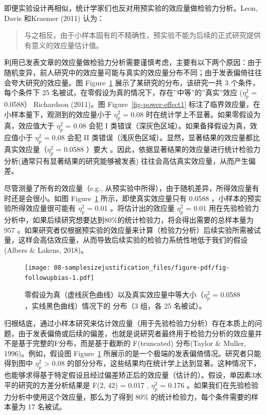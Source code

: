 \documentclass[
  letterpaper,
  DIV=11,
  numbers=noendperiod]{scrreprt}
\begin{document}
即便实验设计再相似，统计学家们也反对用预实验的效应量做检验力分析。Leon,
Davis 和Kraemer (2011) 认为：

\begin{quote}
与之相反，由于小样本固有的不精确性，预实验不能为后续的正式研究提供有意义的效应量估计值。
\end{quote}

利用已发表文章的效应量做检验力分析需要谨慎考虑，主要有以下两个原因：由于随机变异，前人研究中的效应量可能与真实的效应量分布不同；由于发表偏倚往往会夸大研究的效应量。图
Figure~\ref{fig-followupbias} 展示了某研究的分布，该研究一共 3
个条件，每个条件下 25
名被试，在零假设为真的情况下，存在''中等''的''真实''效应 (\(\eta_p^2\) =
0.0588） Richardson (2011)。图 Figure~\ref{fig-power-effect1}
标注了临界效应量，在小样本量下，观测到的效应量小于 \(\eta_p^2\) = 0.08
时在统计学上不显著。如果零假设为真，效应值大于 \(\eta_p^2\) = 0.08 会犯
I 类错误（深灰色区域）。如果备择假设为真，效应值小于 \(\eta_p^2\) = 0.08
会犯 II
类错误（浅灰色区域）。显然，显著结果的效应量都比真实效应量（\(\eta_p^2\)
= 0.0588 ）要大
。因此，依据显著结果的效应量进行统计检验力分析(通常只有显著结果的研究能够被发表)
往往会高估真实效应量，从而产生偏差。

尽管测量了所有的效应量（e.g.,
从预实验中所得），由于随机差异，所得效应量有时还是会很小。如图
Figure~\ref{fig-followupbias} 所示，即使真实效应量只有 0.0588
，小样本的预实验所得效应量很可能有 \(\eta_p^2\) = 0.01
。将估计出的效应量 \(\eta_p^2\) = 0.01
用在先验检验力分析中，如果后续研究想要达到80\%的统计检验力，将会得出需要的总样本量为
957
。如果研究者仅根据预实验的效应量来计算（检验力分析）后续实验所需被试量，这样会高估效应量，从而导致后续实验的检验力系统性地低于我们的假设(Albers
\& Lakens, 2018)。

\begin{figure}

{\centering \texttt{[image: 08-samplesizejustification\_files/figure-pdf/fig-followupbias-1.pdf]}

}

\caption{\label{fig-followupbias}零假设为真（虚线灰色曲线）以及真实效应量中等大小（\(\eta_p^2\)
= 0.0588 ，实线黑色曲线）情况下的 分布（3 组，各 25 名被试）。}

\end{figure}

归根结底，通过小样本研究来估计效应量（用于先验检验力分析）存在本质上的问题，由于发表偏倚或后续的偏差，也就是说研究者最终用于检验力分析的效应量并不是基于完整的F分布，而是基于截断的
F(truncated) 分布(Taylor \& Muller, 1996)。例如，假设图
Figure~\ref{fig-followupbias}
所展示的是一个极端的发表偏倚情况。研究者只能得到图中 \(\eta_p^2\)
\textgreater{} 0.08
的部分分布，这些结果均在统计学上达到显著。这种情况下，也能够求得基于特定假设且经过偏差矫正后的效应量（估计的）。假设，单因素3水平的研究的方差分析结果是
F(2, 42) = 0.017 , \(\eta_p^2\) = 0.176
。如果我们在先验检验力分析中使用这个效应量，那么为了得到 80\%
的统计检验力，每个条件需要的样本量为 17 名被试。
\end{document}
